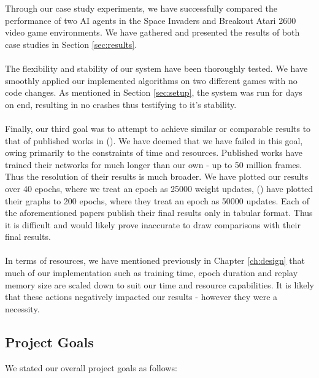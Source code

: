 Through our case study experiments, we have successfully compared the performance of two AI agents in the Space Invaders and Breakout Atari 2600 video game environments. We have gathered and presented the results of both case studies in Section \ref{sec:results}. \paragraph{}

The flexibility and stability of our system have been thoroughly tested. We have smoothly applied our implemented algorithms on two different games with no code changes. As mentioned in Section \ref{sec:setup}, the system was run for days on end, resulting in no crashes thus testifying to it's stability. \paragraph{}

Finally, our third goal was to attempt to achieve similar or comparable results to that of published works in (\citet{human,doubleq,dueling}). We have deemed that we have failed in this goal, owing primarily to the constraints of time and resources. Published works have trained their networks for much longer than our own - up to 50 million frames. Thus the resolution of their results is much broader. We have plotted our results over 40 epochs, where we treat an epoch as 25000 weight updates, (\citet{human}) have plotted their graphs to 200 epochs, where they treat an epoch as 50000 updates. Each of the aforementioned papers publish their final results only in tabular format. Thus it is difficult and would likely prove inaccurate to draw comparisons with their final results. \paragraph{}

In terms of resources, we have mentioned previously in Chapter \ref{ch:design} that much of our implementation such as training time, epoch duration and replay memory size are scaled down to suit our time and resource capabilities. It is likely that these actions negatively impacted our results - however they were a necessity.

\subsection{Project Goals}
We stated our overall project goals as follows:

